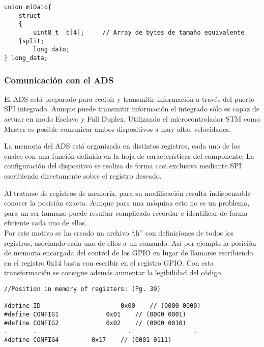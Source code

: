 \begin{lstlisting}[label=algoritmo:STM_Divisor,style = STM-code,frame=single,caption=División de variables en otras de menor tamaño]
union miDato{
	struct
	{
		uint8_t  b[4];     // Array de bytes de tamaño equivalente
	}split;
		long dato;
} long_data; 
\end{lstlisting}
\clearpage

\subsubsection{Comunicación con el ADS \label{sec:Software_micro_ADS}}

El ADS está preparado para recibir y transmitir información a través del puerto SPI integrado. Aunque puede transmitir información el integrado sólo es capaz de actuar en modo Esclavo y \gls{Full Duplex}. Utilizando el microcontrolador STM como Master es posible comunicar ambos dispositivos a muy altas velocidades.

La memoria del ADS está organizada en distintos registros, cada uno de los cuales con una función definida en la hoja de características del componente. La configuración del dispositivo se realiza de forma casi exclusiva mediante SPI escribiendo directamente sobre el registro deseado.

Al tratarse de registros de memoria, para su modificación resulta indispensable conocer la posición exacta. Aunque para una máquina esto no es un problema, para un ser humano puede resultar complicado recordar e identificar de forma eficiente cada uno de ellos. 
\\Por este motivo se ha creado un archivo ``.h'' con definiciones de todos los registros, asociando cada uno de ellos a un comando. Así por ejemplo la posición de memoria encargada del control de los GPIO en lugar de llamarse escribiendo en el registro 0x14 basta con escribir en el registro \textsc{GPIO}. Con esta transformación se consigue además aumentar la legibilidad del código.

\begin{lstlisting}[label=algoritmo:STM_ADS_def,style = STM-code,frame=single,caption=Ejemplo de definiciones de los registros y funciones del ADS]
//Position in memory of registers: (Pg. 39)

#define ID 						0x00	// (0000 0000)
#define CONFIG1  		 	0x01	// (0000 0001) 
#define CONFIG2  			0x02 	// (0000 0010)
.		.						  .					.
#define CONFIG4   		0x17 	// (0001 0111)
\end{lstlisting}

